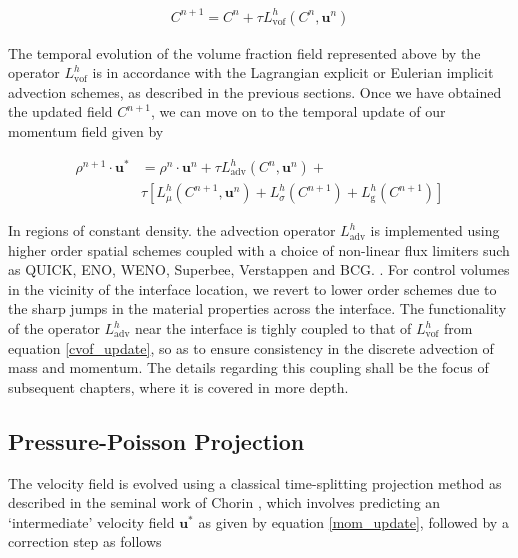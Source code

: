 \begin{align}
	C^{n+1} = C^{n} + \tau L^{h}_{\textrm{vof}}\left( C^{n},\boldsymbol{u}^{n}\right)  
\label{cvof_update}
\end{align}

The temporal evolution of the volume fraction field represented above by the 
operator $L^{h}_{\textrm{vof}}$ is in accordance with the Lagrangian explicit or Eulerian implicit 
advection schemes, as described in the previous sections. 
Once we have obtained the updated field $C^{n+1}$, we can move on to 
the temporal update of our momentum field given by 

\begin{align}
	\rho^{n+1}\cdot \boldsymbol{u}^{*} &= \rho^{n}\cdot \boldsymbol{u}^{n} + \tau L^{h}_{\textrm{adv}}\left( C^{n},\boldsymbol{u}^{n} \right) + \nonumber \\
				      & \tau \left[ L^{h}_{\mu}\left(C^{n+1},\boldsymbol{u}^{n}\right) + L^{h}_{\sigma}\left(C^{n+1}\right) + L^{h}_{\textrm{g}}\left(C^{n+1}\right)\right]
\label{mom_update}
\end{align}

In regions of constant density. the advection operator $L^{h}_{\textrm{adv}}$ 
is implemented using higher order spatial schemes 
coupled with a choice of non-linear flux limiters such as 
QUICK, ENO, WENO, Superbee, Verstappen and BCG.
. 
For control volumes in the vicinity of the interface location, we revert to lower order
schemes due to the sharp jumps in the material properties across the interface.  
The functionality of the operator $L^{h}_{\textrm{adv}}$ near the interface is tighly coupled
to that of $L^{h}_{\textrm{vof}}$ from equation \ref{cvof_update}, 
so as to ensure consistency in the discrete advection of mass and momentum.
The details regarding this coupling shall be the focus 
of subsequent chapters, where it is covered in more depth.

\subsection*{Pressure-Poisson Projection}

The velocity field is evolved using a classical time-splitting projection method 
as described in the seminal work of Chorin \cite{chorin1969convergence}, 
which involves predicting an `intermediate' velocity field $\boldsymbol{u}^{*}$ 
as given by equation \ref{mom_update}, followed by a correction step as follows        

